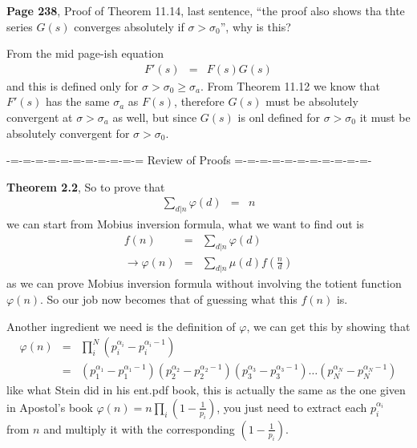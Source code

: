 \documentclass[aps,preprint,preprintnumbers,nofootinbib,showpacs,prd]{revtex4-1}
\newcommand{\nbea}{\begin{eqnarray*}}
\newcommand{\neea}{\end{eqnarray*}}
\begin{document}
{\bf Page 238}, Proof of Theorem 11.14, last sentence, ``the proof also shows tha thte series $G(s)$ converges absolutely if $\sigma > \sigma_0$'', why is this?

From the mid page-ish equation
%
\nbea
F'(s) & = & F(s) G(s)
\neea
%
and this is defined only for $\sigma > \sigma_0 \ge \sigma_a$. From Theorem 11.12 we know that $F'(s)$ has the same $\sigma_a$ as $F(s)$, therefore $G(s)$ must be absolutely convergent at $\sigma > \sigma_a$ as well, but since $G(s)$ is onl defined for $\sigma > \sigma_0$ it must be absolutely convergent for $\sigma > \sigma_0$.












-=-=-=-=-=-=-=-=-=-=-= Review of Proofs  =-=-=-=-=-=-=-=-=-=-=-


{\bf Theorem 2.2}, So to prove that
%
\nbea
\sum_{d|n}\varphi(d) & = & n
\neea
%
we can start from Mobius inversion formula, what we want to find out is
%
\nbea
f(n) & = & \sum_{d|n} \varphi(d) \\
\to \varphi(n) & = & \sum_{d|n}\mu(d) f\left(\frac{n}{d}\right)
\neea
%
as we can prove Mobius inversion formula without involving the totient function $\varphi(n)$. So our job now becomes that of guessing what this $f(n)$ is.

Another ingredient we need is the definition of $\varphi$, we can get this by showing that 
%
\nbea
\varphi(n) & = & \prod_i^N (p_i^{\alpha_i} - p_i^{\alpha_i-1}) \\
& = & \left ( p_1^{\alpha_1} - p_1^{\alpha_1-1}\right ) \left ( p_2^{\alpha_2} - p_2^{\alpha_2-1}\right ) \left ( p_3^{\alpha_3} - p_3^{\alpha_3-1}\right ) \ldots \left ( p_N^{\alpha_N} - p_N^{\alpha_N-1}\right )
\neea
%
like what Stein did in his ent.pdf book, this is actually the same as the one given in Apostol's book $\varphi(n) = n\prod_i\left(1-\frac{1}{p_i}\right)$, you just need to extract each $p_i^{\alpha_i}$ from $n$ and multiply it with the corresponding $\left(1-\frac{1}{p_i}\right)$.
\end{document}
